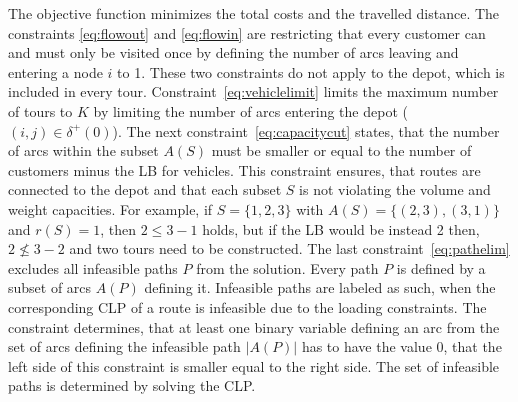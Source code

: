The objective function minimizes the total costs and the travelled distance. The constraints \ref{eq:flowout} and \ref{eq:flowin}
are restricting that every customer can and must only be visited once by defining the number
of arcs leaving and entering a node $i$ to 1. These two constraints do not apply to the depot,
which is included in every tour. Constraint~\ref{eq:vehiclelimit} limits the maximum number of
tours to $K$ by limiting the number of arcs entering the depot ($(i,j)\in \delta^+(0)$).
The next constraint~\ref{eq:capacitycut} states, that the number of arcs within the subset $A(S)$
must be smaller or equal to the number of customers minus the \gls{LB} for vehicles. This constraint
ensures, that routes are connected to the depot and that each subset $S$ is not violating
the volume and weight capacities. For example, if $S=\{1,2,3\}$ with $A(S)=\{(2,3),(3,1)\}$
and $r(S) = 1$, then $2 \leq 3 - 1$ holds, but if the \gls{LB} would be instead 2 then, $2 \not\leq 3 - 2$
and two tours need to be constructed. The last constraint~\ref{eq:pathelim} excludes all infeasible paths
$P$ from the solution. Every path $P$ is defined by a subset of arcs $A(P)$ defining it. Infeasible
paths are labeled as such, when the corresponding \gls{CLP} of a route is infeasible due to the loading
constraints. The constraint determines, that at least one binary variable defining an arc
from the set of arcs defining the infeasible path $|A(P)|$ has to have the value 0, that the left
side of this constraint is smaller equal to the right side. The set of infeasible paths is determined by
solving the \gls{CLP}.





